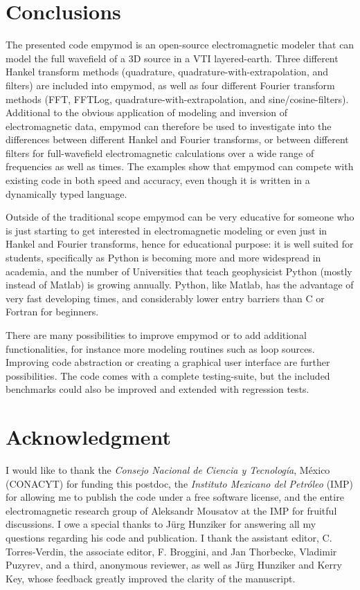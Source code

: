 \documentclass[paper]{geophysics}
\begin{document}
\section{Conclusions}

The presented code empymod is an open-source electromagnetic modeler that can
model the full wavefield of a 3D source in a VTI layered-earth. Three different
Hankel transform methods (quadrature, quadrature-with-extrapolation, and
filters) are included into empymod, as well as four different Fourier transform
methods (FFT, FFTLog, quadrature-with-extrapolation, and sine/cosine-filters).
Additional to the obvious application of modeling and inversion of
electromagnetic data, empymod can therefore be used to investigate into the
differences between different Hankel and Fourier transforms, or between
different filters for full-wavefield electromagnetic calculations over a wide
range of frequencies as well as times. The examples show that empymod can
compete with existing code in both speed and accuracy, even though it is
written in a dynamically typed language.

Outside of the traditional scope empymod can be very educative for someone who
is just starting to get interested in electromagnetic modeling or even just in
Hankel and Fourier transforms, hence for educational purpose: it is well suited
for students, specifically as Python is becoming more and more widespread in
academia, and the number of Universities that teach geophysicist Python (mostly
instead of Matlab) is growing annually. Python, like Matlab, has the advantage
of very fast developing times, and considerably lower entry barriers than C or
Fortran for beginners. 

There are many possibilities to improve empymod or to add additional
functionalities, for instance more modeling routines such as loop sources.
Improving code abstraction or creating a graphical user interface are further
possibilities. The code comes with a complete testing-suite, but the included
benchmarks could also be improved and extended with regression tests.


\section{Acknowledgment}

I would like to thank the \emph{Consejo Nacional de Ciencia y Tecnología},
México (CONACYT) for funding this postdoc, the \emph{Instituto Mexicano del
Petróleo} (IMP) for allowing me to publish the code under a free software
license, and the entire electromagnetic research group of Aleksandr Mousatov at
the IMP for fruitful discussions. I owe a special thanks to Jürg Hunziker for
answering all my questions regarding his code and publication. I thank the
assistant editor, C. Torres-Verdin, the associate editor, F. Broggini, and Jan
Thorbecke, Vladimir Puzyrev, and a third, anonymous reviewer, as well as Jürg
Hunziker and Kerry Key, whose feedback greatly improved the clarity of the
manuscript.
\end{document}

